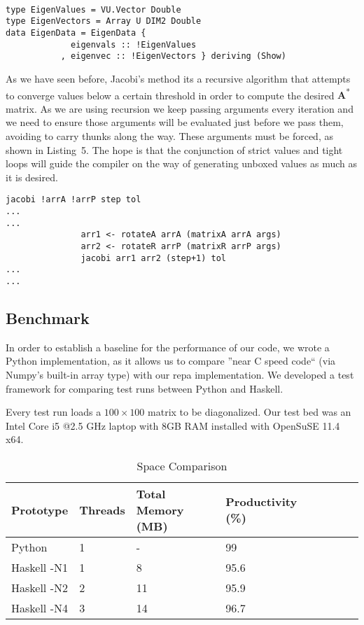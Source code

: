 \documentclass{tmr}
\begin{document}
\begin{lstlisting}[float,captionpos=b,belowcaptionskip=4pt, caption= Strict data types for eigenvalue operations]

type EigenValues = VU.Vector Double
type EigenVectors = Array U DIM2 Double
data EigenData = EigenData {
             eigenvals :: !EigenValues
           , eigenvec :: !EigenVectors } deriving (Show)

\end{lstlisting}

As we have seen before, Jacobi's method its a recursive algorithm that
attempts to converge values below a certain threshold in order to
compute the desired {\textbf A\textsuperscript{*}} matrix.  As we are
using recursion we keep passing arguments every iteration and we need to
ensure those arguments will be evaluated just before we pass them,
avoiding to carry thunks along the way. These arguments must be forced,
as shown in Listing~5. The hope is that the conjunction of strict values
and tight loops will guide the compiler on the way of generating unboxed values as much as it is desired.

\begin{lstlisting}[float,captionpos=b,belowcaptionskip=4pt, caption= Jacobi strict argument passing]
jacobi !arrA !arrP step tol
...
...
               arr1 <- rotateA arrA (matrixA arrA args)
               arr2 <- rotateR arrP (matrixR arrP args)
               jacobi arr1 arr2 (step+1) tol
...
...
\end{lstlisting}

\subsection{Benchmark}

In order to establish a baseline for the performance of our code, we
wrote a Python implementation, as it allows us to compare ''near C speed
code`` (via Numpy's built-in array type) with our repa implementation.
We developed a test framework for comparing test runs between Python and
Haskell.

Every test run loads a $100\times 100$ matrix to be diagonalized.  Our
test bed was an Intel Core i5 @2.5 GHz laptop with 8GB RAM installed
with OpenSuSE 11.4 x64.

\begin{table}[float,captionpos=b,belowcaptionskip=4pt]
\begin{center}
    \begin{tabular}{ | l | l | l | l | l | l | l| l |}
\hline  Prototype & Threads & Total Memory (MB) & Productivity (\%) \\ 
\hline  Python  & 1 & -  & 99   \\
\hline  Haskell -N1 & 1 & 8  & 95.6  \\
\hline  Haskell -N2 & 2 & 11 & 95.9  \\
\hline  Haskell -N4 & 3 & 14 & 96.7   \\
\hline
    \end{tabular} 
\end{center}
\label{tab:first}
\caption{Space Comparison}
\end{table}
\end{document}

